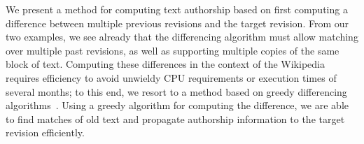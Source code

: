We present a method for computing text authorship based on
first computing a difference between multiple previous revisions and
the target revision.
From our two examples, we see already that the differencing
algorithm must allow matching over multiple past revisions, as
well as supporting multiple copies of the same block of text.
Computing these differences in the context of the Wikipedia
requires efficiency to avoid unwieldy CPU requirements
or execution times of several months;
to this end, we resort to a method based on greedy differencing
algorithms~\cite{Reichenberger1991,Burns1997}.
Using a greedy algorithm for computing the difference, we are
able to find matches of old text and propagate authorship
information to the target revision efficiently.

